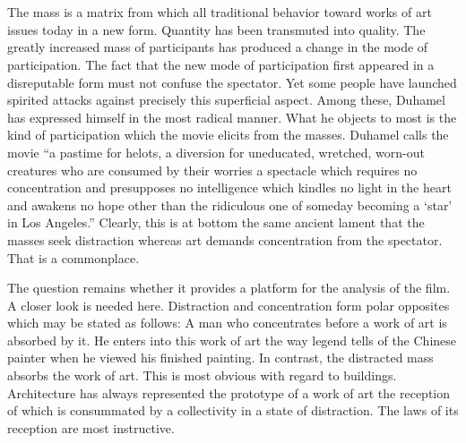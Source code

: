 \documentclass[11pt, letterpaper]{article}
\begin{document}
\section{}

The mass is a matrix from which all traditional behavior toward works of art
issues today in a new form. Quantity has been transmuted into quality. The
greatly increased mass of participants has produced a change in the mode of
participation. The fact that the new mode of participation first appeared in a
disreputable form must not confuse the spectator. Yet some people have launched
spirited attacks against precisely this superficial aspect. Among these,
Duhamel has expressed himself in the most radical manner. What he objects to
most is the kind of participation which the movie elicits from the masses.
Duhamel calls the movie “a pastime for helots, a diversion for uneducated,
wretched, worn-out creatures who are consumed by their worries a spectacle
which requires no concentration and presupposes no intelligence which kindles
no light in the heart and awakens no hope other than the ridiculous one of
someday becoming a ‘star’ in Los Angeles.” Clearly, this is at bottom the same
ancient lament that the masses seek distraction whereas art demands
concentration from the spectator. That is a commonplace.

The question remains whether it provides a platform for the analysis of the
film. A closer look is needed here. Distraction and concentration form polar
opposites which may be stated as follows: A man who concentrates before a work
of art is absorbed by it. He enters into this work of art the way legend tells
of the Chinese painter when he viewed his finished painting. In contrast, the
distracted mass absorbs the work of art. This is most obvious with regard to
buildings. Architecture has always represented the prototype of a work of art
the reception of which is consummated by a collectivity in a state of
distraction. The laws of its reception are most instructive.
\end{document}
